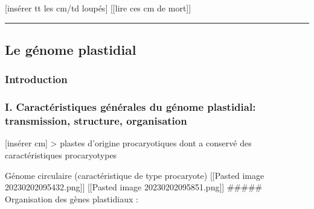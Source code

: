 \documentclass[
]{article}
\author{}
\date{}
\begin{document}
{[}insérer tt les cm/td loupés{]} {[}{[}lire ces cm de mort{]}{]}

\begin{center}\rule{0.5\linewidth}{0.5pt}\end{center}

\hypertarget{le-guxe9nome-plastidial}{%
\subsection{Le génome plastidial}\label{le-guxe9nome-plastidial}}

\hypertarget{introduction}{%
\subsubsection{Introduction}\label{introduction}}

\hypertarget{i.-caractuxe9ristiques-guxe9nuxe9rales-du-guxe9nome-plastidial-transmission-structure-organisation}{%
\subsubsection{I. Caractéristiques générales du génome plastidial:
transmission, structure,
organisation}\label{i.-caractuxe9ristiques-guxe9nuxe9rales-du-guxe9nome-plastidial-transmission-structure-organisation}}

{[}insérer cm{]} \textgreater{} plastes d’origine procaryotiques dont a
conservé des caractéristiques procaryotypes

Génome circulaire (caractéristique de type procaryote) {[}{[}Pasted
image 20230202095432.png{]}{]} {[}{[}Pasted image
20230202095851.png{]}{]} \#\#\#\#\# Organisation des gènes plastidiaux :
\end{document}
